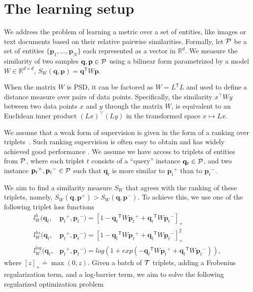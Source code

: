 \documentclass[twoside,11pt]{article}
\newcommand\mat[1]{{#1}}
\renewcommand\vec[1]{\mathbf{#1}}
\newcommand{\T}{{}^\mathsf{T}}
\newcommand{\W}{\mat{W}}
\newcommand{\eqdef}{\doteq}
\newcommand{\Rd}{\mathbb{R}^d}
\newcommand{\ignore}[1]{}
\newcommand{\q}{{\vec{q}}}
\newcommand{\p}{{\vec{p}}}
\newcommand{\trip}{{t}}
\newcommand{\qt}{{\q_{\trip}}}
\newcommand{\pt}{{\p_{\trip}}}
\newcommand{\cholL}{\mat{L}}
\begin{document}
\ignore{
We take here an approach based on minimizing a strongly convex function using block-coordinate descent. There is a well established body of work analyzing the convergence of block-coordinate descent, e.g. \citep{nesterov2012efficiency,richtarik2014iteration}. We discuss this further in Section 5 below.
}

\section{The learning setup}
We address the problem of learning a metric over a set of
entities, like images or text documents based on their
relative pairwise similarities. Formally, let $\cal{P}$ be a set of entities $\{\p_1,...,\p_N\}$ each represented as a vector in $\Rd$. We measure the similarity of two samples $\q, \p \in \cal{P}$ using a bilinear form parametrized by a model $\W \in \mathbb{R}^{d \times d}$, $S_{\W}(\q, \p) = \q\T \W \p$.

When the matrix $\W$ is PSD, it can be factored as $\W = \cholL\T \cholL$ and used to define a distance measure over pairs of data points. Specifically, the similarity $x^\top\W y$ between two data points $x$ and $y$ through the matrix $\W$, is equivalent to an Euclidean inner product  $(\cholL x)^\top(\cholL y)$ in the transformed space $x \mapsto \cholL x$. 

We assume that a weak form of supervision is given in the form of a ranking over triplets~\citep{weinberger2006dml,OASIS,qian}. Such ranking supervision is often easy to obtain and has widely achieved good performance . We assume we have access to triplets of entities from $\cal{P}$, where each triplet $t$ consists of
a ``query'' instance $\qt \in \cal{P}$, and two instance $\pt^{+}, \pt^{-} \in \cal{P}$ such that $\qt$ is more similar to $\pt^{+}$
than to $\pt^{-}$.

We aim to find a similarity measure $S_{\W}$ that agrees with the ranking of these triplets, namely, $S_{\W}(\q, \p^{+}) > S_{\W}(\q,
\p^{-})$. To achieve this, we use one of the following triplet loss functions
\begin{align}
\label{single-triplet-lossed}
l_{\W}^h(\qt, &\pt^{+}, \pt^{-}) = [1-\qt\T\W\pt^+ + \qt\T\W\pt^-]_{+}
 \\ \nonumber
l_{\W}^{hs}(\qt, &\pt^+, \pt^-) = [1-\qt\T\W\pt^+ + \qt\T\W\pt^-]_{+}^2
 \\ \nonumber
l_{\W}^{log}(\qt, &\pt^+, \pt^-) = log(1+exp(-\qt\T\W\pt^+ + \qt\T\W\pt^-)) \nonumber ,
\end{align}
where $[z]_{+} \eqdef \max(0,z)$. Given a batch of $\cal{T}$ triplets, adding a Frobenius regularization term, and a log-barrier term, we aim to solve the following regularized optimization problem
\end{document}
